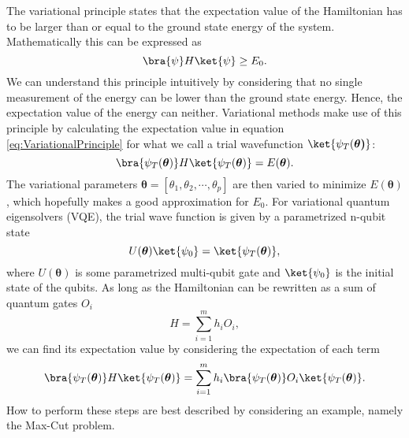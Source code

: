 The variational principle states that the expectation value of the Hamiltonian has to be larger than or equal to the ground state energy of the system. Mathematically this can be expressed as
\begin{equation}
    \label{eq:VariationalPrinciple}
    \bra{\psi} H \ket{\psi} \geq E_0.
\end{equation}
We can understand this principle intuitively by considering that no single measurement of the energy can be lower than the ground state energy. Hence, the expectation value of the energy can neither. Variational methods make use of this principle by calculating the expectation value in equation  \ref{eq:VariationalPrinciple} for what we call a trial wavefunction $\ket{\psi_T(\boldsymbol{\theta)}}$:
$$\bra{\psi_T(\boldsymbol{\theta})} H \ket{\psi_T(\boldsymbol{\theta})} = E(\boldsymbol{\theta}).$$
The variational parameters $\boldsymbol{\theta} = [\theta_1, \theta_2, \cdots, \theta_p]$ are then varied to minimize $E(\boldsymbol{\theta})$, which hopefully makes a good approximation for $E_0$. For variational quantum eigensolvers (VQE), the trial wave function is given by a parametrized n-qubit state
$$ U(\boldsymbol{\theta}) \ket{\psi_0} = \ket{\psi_T(\boldsymbol{\theta})}, $$
where $U(\boldsymbol{\theta})$ is some parametrized multi-qubit gate and $\ket{\psi_0}$ is the initial state of the qubits.
As long as the Hamiltonian can be rewritten as a sum of quantum gates $O_i$
$$ H = \sum_{i=1}^m h_i O_i, $$
we can find its expectation value by considering the expectation of each term
\begin{equation}
    \label{eq:VQEExpectationValueofHamiltonian}
    \bra{\psi_T(\boldsymbol{\theta})} H \ket{\psi_T(\boldsymbol{\theta})} = \sum_{i=1}^m h_i \bra{\psi_T(\boldsymbol{\theta})} O_i \ket{\psi_T(\boldsymbol{\theta})}.
\end{equation}
How to perform these steps are best described by considering an example, namely the Max-Cut problem.

